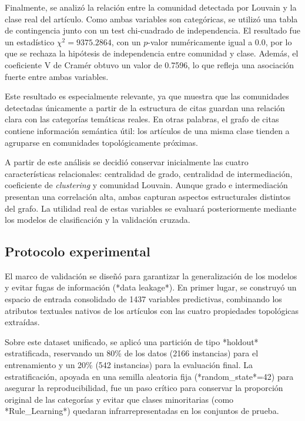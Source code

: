 \documentclass[conference,a4paper]{IEEEtran}
\begin{document}
Finalmente, se analizó la relación entre la comunidad detectada por Louvain y la clase real del artículo. Como ambas variables son categóricas, se utilizó una tabla de contingencia junto con un test chi-cuadrado de independencia. El resultado fue un estadístico $\chi^2 = 9375.2864$, con un $p$-valor numéricamente igual a 0.0, por lo que se rechaza la hipótesis de independencia entre comunidad y clase. Además, el coeficiente V de Cramér obtuvo un valor de 0.7596, lo que refleja una asociación fuerte entre ambas variables.

Este resultado es especialmente relevante, ya que muestra que las comunidades detectadas únicamente a partir de la estructura de citas guardan una relación clara con las categorías temáticas reales. En otras palabras, el grafo de citas contiene información semántica útil: los artículos de una misma clase tienden a agruparse en comunidades topológicamente próximas.

A partir de este análisis se decidió conservar inicialmente las cuatro características relacionales: centralidad de grado, centralidad de intermediación, coeficiente de \textit{clustering} y comunidad Louvain. Aunque grado e intermediación presentan una correlación alta, ambas capturan aspectos estructurales distintos del grafo. La utilidad real de estas variables se evaluará posteriormente mediante los modelos de clasificación y la validación cruzada.

\subsection{Protocolo experimental}

El marco de validación se diseñó para garantizar la generalización de los modelos y evitar fugas de información (*data leakage*). En primer lugar, se construyó un espacio de entrada consolidado de 1437 variables predictivas, combinando los atributos 
textuales nativos de los artículos con las cuatro propiedades topológicas extraídas.

Sobre este dataset unificado, se aplicó una partición de tipo *holdout* estratificada, reservando un 80\% de los datos (2166 instancias) para el entrenamiento y un 20\% (542 instancias) para la evaluación final. La estratificación, apoyada en una 
semilla aleatoria fija (*random\_state*=42) para asegurar la reproducibilidad, fue un paso crítico para conservar la proporción original de las categorías y evitar que clases minoritarias (como *Rule\_Learning*) quedaran infrarrepresentadas en los 
conjuntos de prueba.
\end{document}
